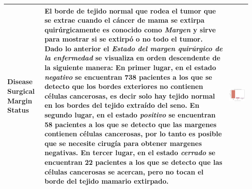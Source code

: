 \begin{table}[!htb]
	\footnotesize
	\begin{threeparttable}
		\begin{tabular}{p{2.5cm} p{7.5cm} p{6.5cm}} \toprule
			
			Disease Surgical Margin Status
			& El borde de tejido normal que rodea el tumor que se extrae cuando el cáncer de mama se extirpa quirúrgicamente es conocido como \textit{Margen} y sirve para mostrar si se extirpó o no todo el tumor\cite{Susan}. Dado lo anterior el \textit{Estado del margen quirúrgico de la enfermedad} se visualiza en orden descendente de la siguiente manera: En primer lugar, en el estado \textit{negativo} se encuentran 738 pacientes a los que se detecto que los bordes exteriores no contienen células cancerosas, es decir solo hay tejido normal en los bordes del tejido extraído del seno. En segundo lugar, en el estado \textit{positivo} se encuentran 58 pacientes a los que se detecto que las margenes contienen células cancerosas, por lo tanto es posible que se necesite cirugía para obtener margenes negativas. En tercer lugar, en el estado \textit{cerrado} se encuentran 22 pacientes a los que se detecto que las células cancerosas se acercan, pero no tocan el borde del tejido mamario extirpado.
			& \begin{center}\includegraphics[width=1\linewidth]{NOTEBOOK/IMAGENES_DESCRIPTIVAS/34_disease_surgical_margin_status}\end{center}
			\\ \hline
			

\end{tabular}
\end{threeparttable}
\end{table}
